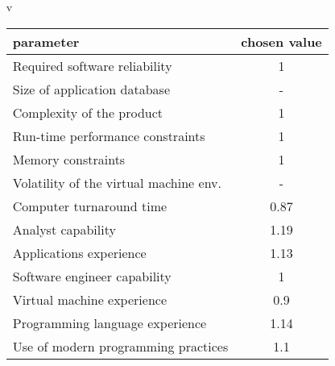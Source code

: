 \documentclass{scrartcl}
\begin{document}
\begin{itemize}
	\item[v]
	\begin{tabular}{l | c}
		parameter & chosen value \\
		\hline
		Required software reliability & 1\\
		Size of application database & -\\
		Complexity of the product & 1\\
		Run-time performance constraints  & 1\\
		Memory constraints & 1\\
		Volatility of the virtual machine env. & -\\
		Computer turnaround time & 0.87\\
		Analyst capability & 1.19\\
		Applications experience & 1.13\\
		Software engineer capability & 1\\
		Virtual machine experience & 0.9\\
		Programming language experience & 1.14\\
		Use of modern programming practices & 1.1\\

\end{tabular}
\end{itemize}
\end{document}
